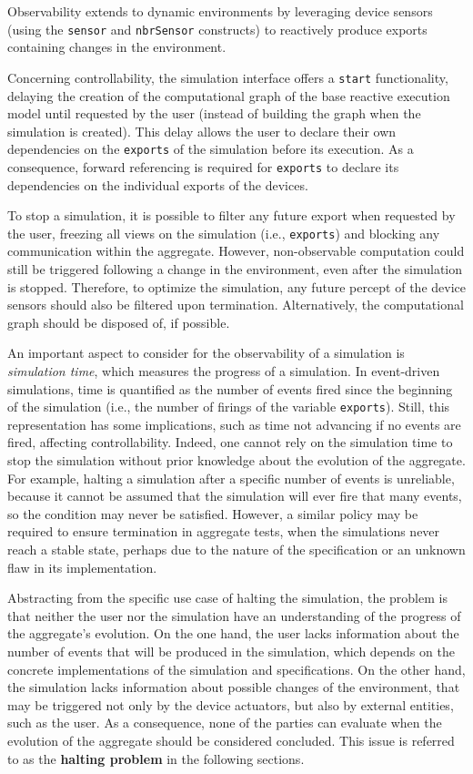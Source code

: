 Observability extends to dynamic environments by leveraging device sensors
(using the \texttt{sensor} and \texttt{nbrSensor} constructs) to reactively
produce exports containing changes in the environment.

Concerning controllability, the simulation interface offers a \texttt{start}
functionality, delaying the creation of the computational graph of the base
reactive execution model until requested by the user (instead of building the
graph when the simulation is created). This delay allows the user to declare
their own dependencies on the \texttt{exports} of the simulation before its
execution. As a consequence, forward referencing is required for
\texttt{exports} to declare its dependencies on the individual exports of the
devices.

To stop a simulation, it is possible to filter any future export when requested
by the user, freezing all views on the simulation (i.e., \texttt{exports}) and
blocking any communication within the aggregate. However, non-observable
computation could still be triggered following a change in the environment,
even after the simulation is stopped. Therefore, to optimize the simulation,
any future percept of the device sensors should also be filtered upon
termination. Alternatively, the computational graph should be disposed of, if
possible.

An important aspect to consider for the observability of a simulation is
\textit{simulation time}, which measures the progress of a simulation. In
event-driven simulations, time is quantified as the number of events fired
since the beginning of the simulation (i.e., the number of firings of the
variable \texttt{exports}). Still, this representation has some implications,
such as time not advancing if no events are fired, affecting controllability.
Indeed, one cannot rely on the simulation time to stop the simulation without
prior knowledge about the evolution of the aggregate. For example, halting a
simulation after a specific number of events is unreliable, because it cannot
be assumed that the simulation will ever fire that many events, so the
condition may never be satisfied. However, a similar policy may be required to
ensure termination in aggregate tests, when the simulations never reach a
stable state, perhaps due to the nature of the specification or an unknown flaw
in its implementation.

Abstracting from the specific use case of halting the simulation, the problem
is that neither the user nor the simulation have an understanding of the
progress of the aggregate's evolution. On the one hand, the user lacks
information about the number of events that will be produced in the simulation,
which depends on the concrete implementations of the simulation and
specifications. On the other hand, the simulation lacks information about
possible changes of the environment, that may be triggered not only by the
device actuators, but also by external entities, such as the user. As a
consequence, none of the parties can evaluate when the evolution of the
aggregate should be considered concluded. This issue is referred to as the
\textbf{halting problem} in the following sections.
